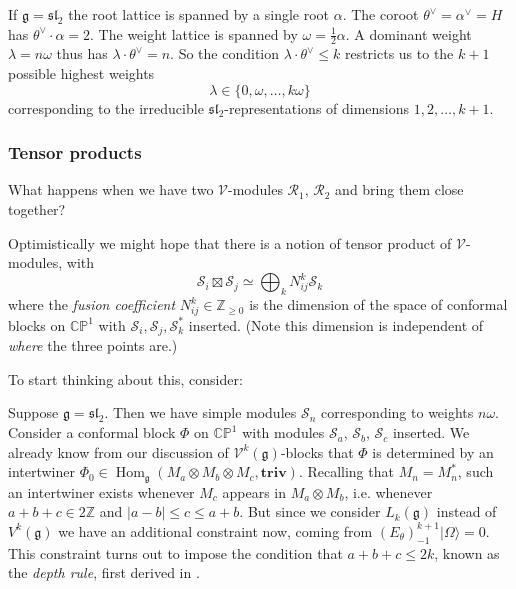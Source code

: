 \documentclass[12pt,letterpaper,reqno]{amsart}
\numberwithin{equation}{section}
\newcommand{\fg}{{\mathfrak g}}
\newcommand{\fsl}{{\mathfrak {sl}}}
\newcommand{\cS}{\ensuremath{\mathcal S}}
\newcommand{\bbC}{\ensuremath{\mathbb C}}
\newcommand{\bbP}{\ensuremath{\mathbb P}}
\newcommand{\bbZ}{\ensuremath{\mathbb Z}}
\newcommand\vac{{|\Omega\rangle}}
\newcommand\triv{{\mathbf {triv}}}
\newcommand{\vertex}{\mathcal{V}}
\newcommand{\vrep}{\mathcal{R}}
\newcommand{\abs}[1]{\lvert#1\rvert}
\newcommand{\ti}[1]{\textit{#1}}
\DeclareMathOperator{\Hom}{Hom}
\begin{document}
\begin{example}
If $\fg = \fsl_2$ the root lattice is spanned by a single root $\alpha$. The coroot $\theta^\vee = \alpha^\vee = H$ has 
$\theta^\vee \cdot \alpha = 2$.
The weight lattice is spanned by $\omega = \frac12 \alpha$.
A dominant weight $\lambda = n \omega$ thus has $\lambda \cdot \theta^\vee = n$.
So the condition $\lambda \cdot \theta^\vee \le k$ restricts us to the $k+1$ possible highest weights
\begin{equation}
  \lambda \in \{0, \omega, \dots, k \omega\}
\end{equation}
corresponding to the irreducible $\fsl_2$-representations of 
dimensions $1, 2, \dots, k+1$.
\end{example}



\subsubsection{Tensor products}

What happens when we have two $\vertex$-modules $\vrep_1$, $\vrep_2$
and bring them close together?

Optimistically we might hope that there is a notion of tensor product
of $\vertex$-modules, with
\begin{equation} \label{eq:boxtimes-coeff}
  \cS_i \boxtimes \cS_j \simeq \bigoplus_k N_{ij}^k \cS_k
\end{equation}
where the \ti{fusion coefficient}
$N_{ij}^k \in \bbZ_{\ge 0}$ is 
the dimension of the space of conformal blocks on $\bbC \bbP^1$
with $\cS_i, \cS_j, \cS_k^*$ inserted. (Note this dimension is independent
of \ti{where} the three points are.)

To start thinking about this, consider:
\begin{example}
Suppose $\fg = \fsl_2$.
Then we have simple modules $\cS_n$ corresponding to weights $n \omega$.
Consider a conformal block $\Phi$ on $\bbC \bbP^1$
with modules $\cS_a$, $\cS_b$, $\cS_c$ inserted. We already know from our discussion of 
$\vertex^k(\fg)$-blocks that $\Phi$ is determined by an intertwiner
$\Phi_0 \in \Hom_\fg(M_a \otimes M_b \otimes M_c, \triv)$.
Recalling that $M_n = M_n^*$, such an intertwiner exists 
whenever $M_c$ appears in $M_a \otimes M_b$, i.e. 
whenever $a+b+c \in 2\bbZ$ and 
$\abs{a-b} \le c \le a+b$.
But since we consider $L_k(\fg)$ instead of $V^k(\fg)$
we have an additional constraint now, 
coming from $(E_\theta)_{-1}^{k+1} \vac = 0$. 
This constraint turns out to impose the condition that $a + b + c \le 2k$,
known as the \ti{depth rule}, first derived in \cite{GepnerWitten1986}.
\end{example}
\end{document}
